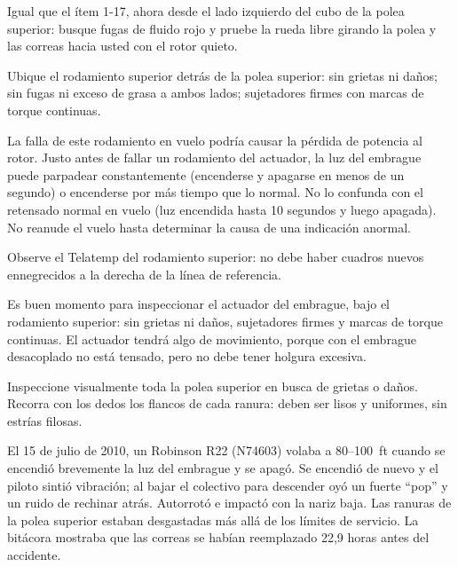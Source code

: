 Igual que el ítem 1-17, ahora desde el lado izquierdo del cubo de la polea superior: busque fugas de fluido rojo y pruebe la rueda libre girando la polea y las correas hacia usted con el rotor quieto.

Ubique el rodamiento superior detrás de la polea superior: sin grietas ni daños; sin fugas ni exceso de grasa a ambos lados; sujetadores firmes con marcas de torque continuas.

\begin{nota}
La falla de este rodamiento en vuelo podría causar la pérdida de potencia al rotor. Justo antes de fallar un rodamiento del actuador, la luz del embrague puede parpadear constantemente (encenderse y apagarse en menos de un segundo) o encenderse por más tiempo que lo normal. No lo confunda con el retensado normal en vuelo (luz encendida hasta 10 segundos y luego apagada). No reanude el vuelo hasta determinar la causa de una indicación anormal.
\end{nota}

Observe el Telatemp del rodamiento superior: no debe haber cuadros nuevos ennegrecidos a la derecha de la línea de referencia.

\begin{nota}
Es buen momento para inspeccionar el actuador del embrague, bajo el rodamiento superior: sin grietas ni daños, sujetadores firmes y marcas de torque continuas. El actuador tendrá algo de movimiento, porque con el embrague desacoplado no está tensado, pero no debe tener holgura excesiva.
\end{nota}

Inspeccione visualmente toda la polea superior en busca de grietas o daños. Recorra con los dedos los flancos de cada ranura: deben ser lisos y uniformes, sin estrías filosas.

\begin{caso}
El 15 de julio de 2010, un Robinson R22 (N74603) volaba a 80--100~ft cuando se encendió brevemente la luz del embrague y se apagó. Se encendió de nuevo y el piloto sintió vibración; al bajar el colectivo para descender oyó un fuerte ``pop'' y un ruido de rechinar atrás. Autorrotó e impactó con la nariz baja. Las ranuras de la polea superior estaban desgastadas más allá de los límites de servicio. La bitácora mostraba que las correas se habían reemplazado 22,9 horas antes del accidente.
\end{caso}

